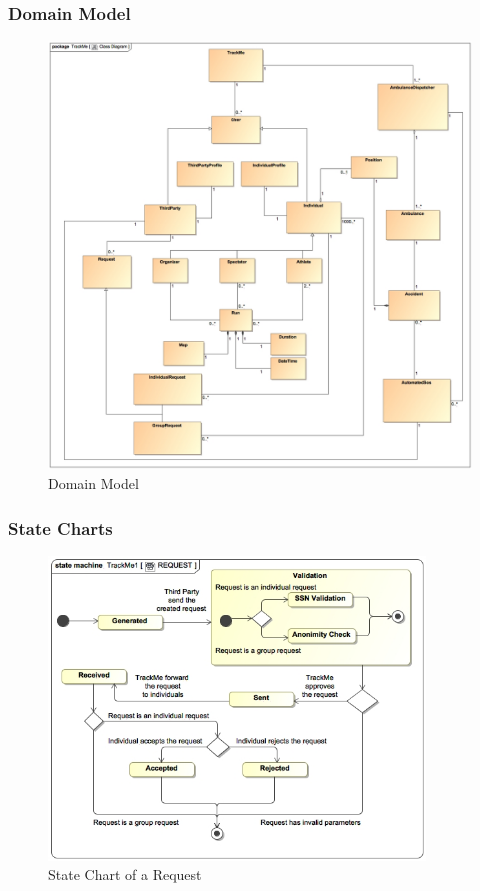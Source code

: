 \documentclass[a4paper]{article}
\begin{document}
    \subsubsection{Domain Model}
    \begin{figure}[!ht]
        \centering
        \includegraphics[width=\textwidth, keepaspectratio]{images/UML/ClassDiagram.jpg}
        \caption{Domain Model}
    \end{figure}
    
    \newpage
    \subsubsection{State Charts}
    
    \begin{figure}[!htpb]
        \centering
        \includegraphics[width=100mm, keepaspectratio]{images/UML/state_request.jpg}
        \caption{State Chart of a Request}
    \end{figure}
    
\end{document}
